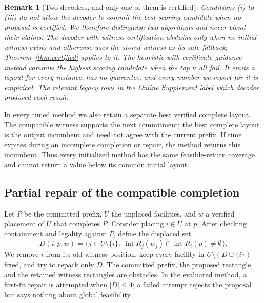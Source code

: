 \documentclass[preprint,12pt,authoryear]{elsarticle}
\newtheorem{rem}{Remark}
\begin{document}
\begin{rem}[Two decoders, and only one of them is certified]
\label{rem:twomodes}
Conditions (i) to (iii) do not allow the decoder to commit the
best scoring candidate when no proposal is certified. We therefore distinguish
two algorithms and never blend their claims. The \emph{decoder with witness certification}
abstains only when no initial witness exists and otherwise uses the
stored witness as its safe fallback; Theorem~\ref{thm:certified} applies to it.
The \emph{heuristic with certificate guidance} instead commits the highest scoring
candidate when the top $\kappa$ all fail. It emits a layout for every instance,
has no guarantee, and every number we report for it is empirical.
The relevant legacy rows in the Online Supplement label which decoder produced
each result.
\end{rem}

In every timed method we also retain a separate best verified complete layout.
The compatible witness supports the next commitment; the best complete layout
is the output incumbent and need not agree with the current prefix. If time
expires during an incomplete completion or repair, the method returns this
incumbent. Thus every initialized method has the same feasible-return coverage
and cannot return a value below its common initial layout.

\subsection{Partial repair of the compatible completion}
\label{sec:partialrepair}

Let $P$ be the committed prefix, $U$ the unplaced facilities, and $w$ a verified
placement of $U$ that completes $P$. Consider placing $i\in U$ at $p$. After
checking containment and legality against $P$, define the displaced set
\begin{equation}
D(i,p;w)=\{j\in U\setminus\{i\}:\
\operatorname{int}R_j(w_j)\cap\operatorname{int}R_i(p)\ne\emptyset\}.
\label{eq:displaced}
\end{equation}
We remove $i$ from its old witness position, keep every facility in
$U\setminus(D\cup\{i\})$ fixed, and try to repack only $D$. The committed prefix,
the proposed rectangle, and the retained witness rectangles are obstacles. In
the evaluated method, a first-fit repair is attempted when $|D|\le4$; a failed
attempt rejects the proposal but says nothing about global feasibility.
\end{document}
